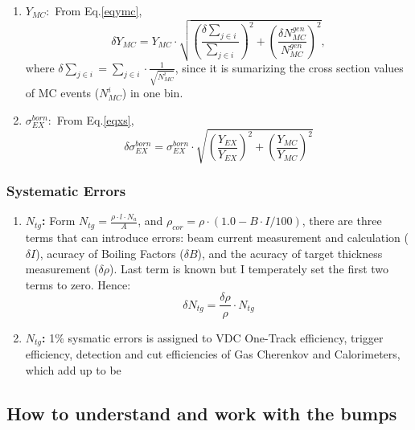 \documentclass[a4paper,10.5pt]{report}
\begin{document}
\begin{enumerate}
\item \textbf{$Y_{MC}:$} From Eq.\ref{eqymc},
\begin{equation}
  \delta Y_{MC} =  Y_{MC} \cdot \sqrt{(\frac{\delta\sum_{j\in i}}{\sum_{j\in i}})^{2}+(\frac{\delta N_{MC}^{gen}}{N_{MC}^{gen}})^{2}},
\end{equation}
where $\delta\sum_{j\in i} = \sum_{j\in i}\cdot\frac{1}{\sqrt{N_{MC}^{i}}}$, since it is sumarizing the cross section values of MC events ($N_{MC}^{i}$) in one bin.

\item \textbf{$\sigma_{EX}^{born}:$} From Eq.\ref{eqxs},
  \begin{equation}
  \delta \sigma_{EX}^{born} = \sigma_{EX}^{born} \cdot \sqrt{(\frac{Y_{EX}}{Y_{EX}})^{2}+(\frac{Y_{MC}}{Y_{MC}})^{2}}
\end{equation}

\end{enumerate}

\subsubsection{Systematic Errors}

\begin{enumerate}

\item \textbf{$N_{tg}$:}  Form $N_{tg} = \frac{\rho\cdot l \cdot N_{a}}{A}$, and $\rho_{cor} = \rho \cdot (1.0 - B \cdot I /100)$, there are three terms that can introduce errors: beam current measurement and calculation ($\delta I$), acuracy of Boiling Factors ($\delta B$), and the acuracy of target thickness measurement ($\delta \rho$). Last term is known but I temperately set the first two terms to zero. Hence:
 \begin{equation}
    \delta N_{tg} = \frac{\delta\rho}{\rho} \cdot N_{tg}
 \end{equation} 
\item \textbf{$N_{tg}$:}  1\% sysmatic errors is assigned to VDC One-Track efficiency, trigger efficiency, detection and cut efficiencies of Gas Cherenkov and Calorimeters, which add up to be 
\end{enumerate}


\subsection{How to understand and work with the bumps}
\end{document}
